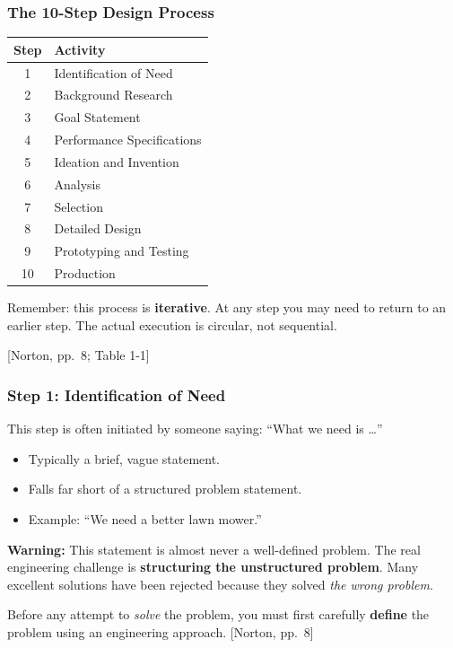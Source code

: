 \documentclass[10pt,aspectratio=43]{beamer}
\newcommand{\pref}[1]{\vfill\hfill{\scriptsize\color{gray}[Norton, pp.~#1]}}
\begin{document}
\begin{frame}
\frametitle{The 10-Step Design Process}

\begin{center}
\begin{tabular}{cl}
\toprule
\textbf{Step} & \textbf{Activity} \\
\midrule
1 & Identification of Need \\
2 & Background Research \\
3 & Goal Statement \\
4 & Performance Specifications \\
5 & Ideation and Invention \\
6 & Analysis \\
7 & Selection \\
8 & Detailed Design \\
9 & Prototyping and Testing \\
10 & Production \\
\bottomrule
\end{tabular}
\end{center}

\vspace{6pt}
\begin{redbox}
Remember: this process is \textbf{iterative}. At any step you may need to return to an earlier step. The actual execution is circular, not sequential.
\end{redbox}
\pref{8; Table 1-1}
\end{frame}

\begin{frame}
\frametitle{Step 1: Identification of Need}

This step is often initiated by someone saying: ``What we need is \ldots''

\vspace{6pt}
\begin{itemize}
  \item Typically a brief, vague statement.
  \item Falls far short of a structured problem statement.
  \item Example: ``We need a better lawn mower.''
\end{itemize}

\vspace{6pt}
\begin{redbox}
\textbf{Warning:} This statement is almost never a well-defined problem. The real engineering challenge is \textbf{structuring the unstructured problem}. Many excellent solutions have been rejected because they solved \emph{the wrong problem}.
\end{redbox}

\vspace{6pt}
Before any attempt to \emph{solve} the problem, you must first carefully \textbf{define} the problem using an engineering approach.
\pref{8}
\end{frame}
\end{document}
